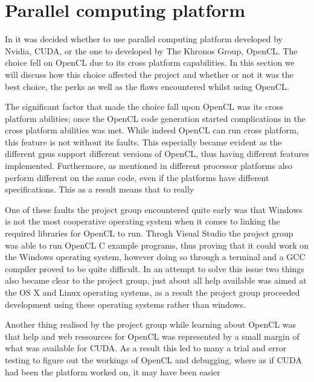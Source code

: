 \section{Parallel computing platform}
In  it was decided whether to use parallel computing platform developed by Nvidia, CUDA, or the one to developed by The Khronos Group, OpenCL.
The choice fell on OpenCL due to its cross platform capabilities.
In this section we will discuss how this choice affected the project and whether or not it was the best choice, the perks as well as the flaws encountered whilst using OpenCL.

The significant factor that made the choice fall upon OpenCL was its cross platform abilities; once the OpenCL code generation started complications in the cross platform abilities was met.
While indeed OpenCL can run cross platform, this feature is not without its faults.
This especially became evident as the different \acrshort{gpu}s support different versions of OpenCL, thus having different features implemented.
Furthermore, as mentioned in  different processor platforms also perform different on the same code, even if the platforms have different specifications.
This as a result means that to really

One of these faults the project group encountered quite early was that Windows is not the most cooperative operating system when it comes to linking the required libraries for OpenCL to run.
Throgh Visual Studio the project group was able to run OpenCL C example programs, thus proving that it could work on the Windows operating system, however doing so through a terminal and a GCC compiler proved to be quite difficult.
In an attempt to solve this issue two things also became clear to the project group, just about all help available was aimed at the OS X and Linux operating systems, as a result the project group proceeded development using these operating systems rather than windows.

Another thing realised by the project group while learning about OpenCL was that help and web ressources for OpenCL was represented by a small margin of what was available for CUDA.
As a result this led to many a trial and error testing to figure out the workings of OpenCL and debugging, where as if CUDA had been the platform worked on, it may have been easier